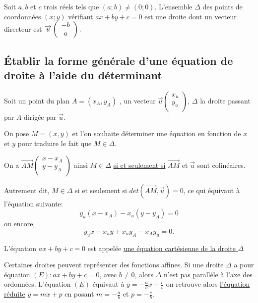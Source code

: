 \documentclass[french]{book}
\begin{document}
\begin{prop}
Soit $a,b$ et $c$ trois réels tels que $(a;b)\neq (0;0)$. L'ensemble $\Delta$ des points de coordonnées $(x;y)$ vérifiant $ax+by+c=0$ est une droite dont un vecteur directeur est $\overrightarrow{u} \left( \begin{array}{c}
-b \\
a \\
\end{array} \right). \\ 
$
\end{prop}

\newpage

\subsection{Établir la forme générale d'une équation de droite à l'aide du déterminant}
 
Soit un point du plan $A=(x_A,y_A)$ , un vecteur $\overrightarrow{u}\left( \begin{array}{c}
x_u\\
y_u \\
\end{array} \right) $, $\Delta$ la droite passant par $A$ dirigée par $\overrightarrow{u}$. 

On pose $M=(x,y)$ et l'on souhaite déterminer une équation en fonction de $x$ et $y$ pour traduire le fait que $M \in \Delta$. 

On a $\overrightarrow{AM} \left( \begin{array}{c}
x-x_A \\
y-y_A \\
\end{array} \right)  
$ ainsi $M \in \Delta$ \underline{si et seulement si} $\overrightarrow{AM}$ et $\overrightarrow{u}$ sont colinéaires.

Autrement dit, $M \in \Delta$ si et seulement si $det(\overrightarrow{AM},\overrightarrow{u})=0$, ce qui équivaut à l'équation suivante:
 $$y_u(x-x_A) -x_u(y-y_A)=0$$
ou encore, 
$$y_u x - x_u y + x_u y_A - x_A y_u = 0 .$$
 
\begin{defn}
L'équation $ax+by+c=0$ est appelée \underline{une équation cartésienne de la droite $\Delta$}
\vspace{3mm}
\end{defn}

Certaines droites peuvent représenter des fonctions affines. Si une droite $\Delta$ a pour équation $(E): ax+by+c=0$, avec $b \neq 0$, alors $\Delta$ n'est pas parallèle à l'axe des ordonnées. L'équation $(E)$ équivaut à $y=- \frac{a}{b} x - \frac{c}{b}$ on retrouve alors \underline{l'équation réduite}  $y=mx+p$ en posant $m=-\frac{a}{b}$ et $p=-\frac{c}{b}$.\\
\end{document}
